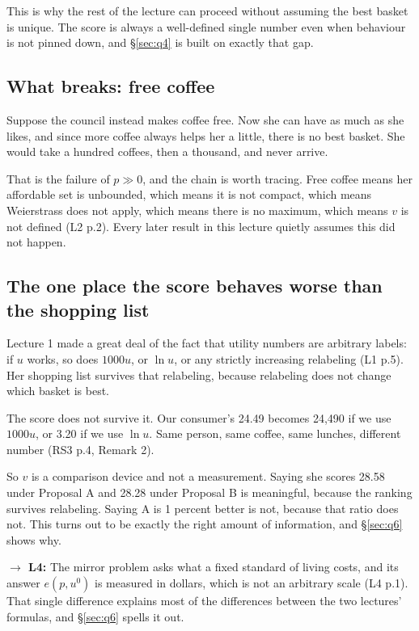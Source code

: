 \documentclass[11pt,letterpaper]{article}
\theoremstyle{definition}
\theoremstyle{plain}
\newcommand{\src}[1]{{\small\textsf{(#1)}}}
\newcommand{\fwd}[1]{\textsf{\textbf{$\rightarrow$ #1:}}}
\begin{document}
This is why the rest of the lecture can proceed without assuming the best basket is unique. The score
is always a well-defined single number even when behaviour is not pinned down, and \S\ref{sec:q4} is
built on exactly that gap.

\subsection{What breaks: free coffee}

Suppose the council instead makes coffee free. Now she can have as much as she likes, and since more
coffee always helps her a little, there is no best basket. She would take a hundred coffees, then a
thousand, and never arrive.

That is the failure of $p \gg 0$, and the chain is worth tracing. Free coffee means her affordable
set is unbounded, which means it is not compact, which means Weierstrass does not apply, which means
there is no maximum, which means $v$ is not defined \src{L2 p.2}. Every later result in this lecture
quietly assumes this did not happen.

\subsection{The one place the score behaves worse than the shopping list}

Lecture 1 made a great deal of the fact that utility numbers are arbitrary labels: if $u$ works, so
does $1000u$, or $\ln u$, or any strictly increasing relabeling \src{L1 p.5}. Her shopping list
survives that relabeling, because relabeling does not change which basket is best.

The score does not survive it. Our consumer's 24.49 becomes 24{,}490 if we use $1000u$, or 3.20 if
we use $\ln u$. Same person, same coffee, same lunches, different number \src{RS3 p.4, Remark 2}.

So $v$ is a comparison device and not a measurement. Saying she scores 28.58 under Proposal A and
28.28 under Proposal B is meaningful, because the ranking survives relabeling. Saying A is 1 percent
better is not, because that ratio does not. This turns out to be exactly the right amount of
information, and \S\ref{sec:q6} shows why.

\fwd{L4} The mirror problem asks what a fixed standard of living costs, and its answer $e(p,u^0)$ is
measured in dollars, which is not an arbitrary scale \src{L4 p.1}. That single difference explains
most of the differences between the two lectures' formulas, and \S\ref{sec:q6} spells it out.
\end{document}
